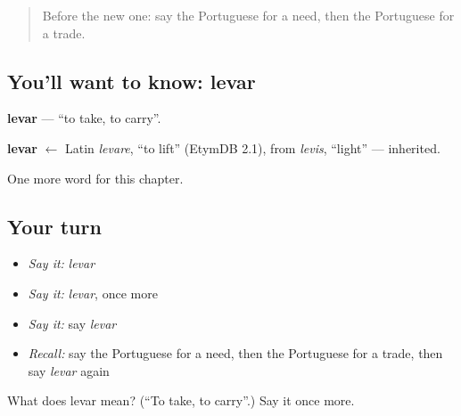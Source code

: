 \begin{quote}
Before the new one: say the Portuguese for a need, then the Portuguese for a trade.
\end{quote}

\subsection*{You'll want to know: levar}
\textbf{levar} — \textquotedblleft{}to take, to carry\textquotedblright{}.

\begin{cousinweb}
\textbf{levar} $\leftarrow$ Latin \emph{levare}, \textquotedblleft{}to lift\textquotedblright{} (EtymDB 2.1), from \emph{levis}, \textquotedblleft{}light\textquotedblright{} — inherited.
\end{cousinweb}

\begin{grammarlens}[title={What you've built}]
One more word for this chapter.
\end{grammarlens}

\subsection*{Your turn}
\begin{itemize}
\raggedright
  \item \emph{Say it:} \emph{levar}
  \item \emph{Say it:} \emph{levar}, once more
  \item \emph{Say it:} say \emph{levar}
  \item \emph{Recall:} say the Portuguese for a need, then the Portuguese for a trade, then say \emph{levar} again
\end{itemize}

\begin{tcolorbox}[breakable,colback=teal!4,colframe=teal!35!black,title={Before you move on}]
What does levar mean? (\textquotedblleft{}To take, to carry\textquotedblright{}.) Say it once more.
\end{tcolorbox}
